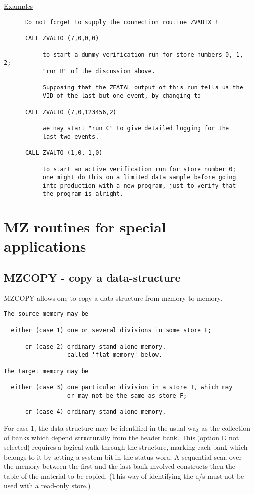 \ul{Examples}
\begin{verbatim}
      Do not forget to supply the connection routine ZVAUTX !

      CALL ZVAUTO (7,0,0,0)

           to start a dummy verification run for store numbers 0, 1, 2;
           "run B" of the discussion above.

           Supposing that the ZFATAL output of this run tells us the
           VID of the last-but-one event, by changing to
 
      CALL ZVAUTO (7,0,123456,2)

           we may start "run C" to give detailed logging for the
           last two events.

      CALL ZVAUTO (1,0,-1,0)

           to start an active verification run for store number 0;
           one might do this on a limited data sample before going
           into production with a new program, just to verify that
           the program is alright.
\end{verbatim} 
\chapter{MZ routines for special applications}

\section{MZCOPY - copy a data-structure}

MZCOPY allows one to copy a data-structure from memory to memory.
\begin{verbatim}
The source memory may be

  either (case 1) one or several divisions in some store F;

      or (case 2) ordinary stand-alone memory,
                  called 'flat memory' below.

The target memory may be

  either (case 3) one particular division in a store T, which may
                  or may not be the same as store F;

      or (case 4) ordinary stand-alone memory.
\end{verbatim} 

For case 1, the data-structure may be identified in the usual way
as the collection of banks which depend structurally
from the header bank.
This (option D not selected) requires a logical walk through
the structure,
marking each bank which belongs to it by setting a system bit
in the status word.
A sequential scan over the memory between the first and the last bank
involved constructs then the table of the material to be copied.
(This way of identifying the d/s must not be used with
a read-only store.)

